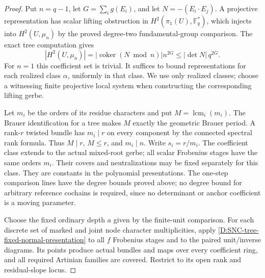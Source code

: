 \begin{proof}
Put $n=q-1$, let $G=\sum_i g(E_i)$, and let
$N=-(E_i\cdot E_j)$. A projective representation
has scalar lifting obstruction in
$H^2(\pi_1(U),\mathbb F_q^*)$, which injects
into $H^2(U,\mu_n)$ by the proved degree-two
fundamental-group comparison. The exact
tree computation gives
\[
 |H^2(U,\mu_n)|=|\operatorname{coker}(N\bmod n)|n^{2G}
                      \leq |\det N|\,q^{2G}.           \tag{D.TC.4}
\]
For $n=1$ this coefficient set is trivial.
It suffices to bound representations for
each realized class $\alpha$, uniformly
in that class. We use only realized
classes; choose a witnessing finite
projective local system when constructing
the corresponding lifting gerbe.

Let $m_i$ be the orders of its residue
characters and put $M=\operatorname{lcm}_i(m_i)$.
The Brauer identification for a tree
makes $M$ exactly the geometric Brauer
period. A rank-$r$ twisted bundle has
$m_i\mid r$ on every component by the
connected spectral rank formula. Thus
$M\mid r$, $M\leq r$, and $m_i\mid n$.
Write $s_i=r/m_i$. The coefficient class
extends to the actual mixed-root gerbe;
all scalar Frobenius stages have the
same orders $m_i$. Their covers and
neutralizations may be fixed separately
for this class. They are constants in
the polynomial presentations. The
one-step comparison lines have the
degree bounds proved above; no degree
bound for arbitrary reference cochains
is required, since no determinant or
anchor coefficient is a moving parameter.

Choose the fixed ordinary depth $a$
given by the finite-unit comparison.
For each discrete set of marked and
joint node character multiplicities,
apply \ref{D:SNC-tree-fixed-normal-presentation}
to all $f$ Frobenius stages and to the
paired unit/inverse diagrams. Its
points produce actual bundles and
maps over every coefficient ring,
and all required Artinian families
are covered. Restrict to its open
rank and residual-slope locus.


\end{proof}
